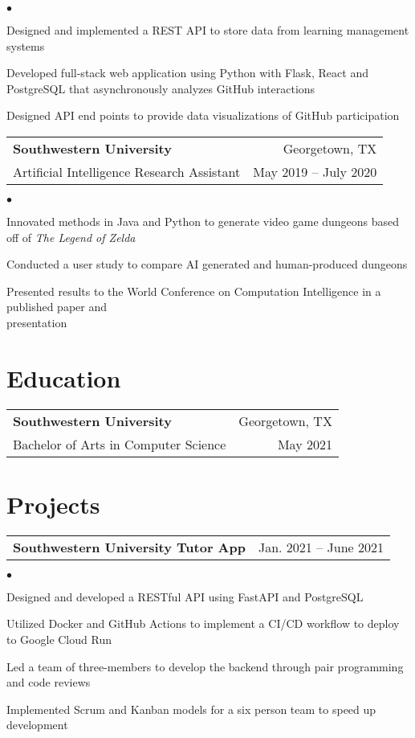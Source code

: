 \documentclass[margin, 11pt]{res}
\makeatletter
\newcommand{\resumeSubheading}[4]{

\begin{tabular*}{1.01\textwidth}{@{\hspace{-4pt}}l @{\extracolsep{\fill}} r}
\textbf{#1} & #2 \\
      {#3} &  {#4}
\end{tabular*}\vspace{-2pt}
}
\newcommand{\resumeSubSubheading}[2]{
\begin{tabular*}{1.01\textwidth}{@{\hspace{-4pt}}l @{\extracolsep{\fill}} r}
    #1 & #2 
\end{tabular*}\vspace{-7pt}
}
\newenvironment{list2}{
	\begin{list}{$\bullet$}{%
	    \small
		\setlength{\itemsep}{0in}
		\setlength{\parsep}{0in} \setlength{\parskip}{0in}
		\setlength{\topsep}{0in} \setlength{\partopsep}{0in}
		\setlength{\leftmargin}{0.2in}}}{\end{list}}
\makeatother
\begin{document}
\begin{resume}
\begin{list2}
\item{Designed and implemented a REST API to store data from learning management systems }
\item{Developed full-stack web application using Python with Flask, React and PostgreSQL that asynchronously analyzes GitHub interactions }
\item{Designed API end points to provide data visualizations of GitHub participation }
\end{list2}

\resumeSubheading{Southwestern University}{Georgetown, TX}
             {Artificial Intelligence Research Assistant}{May 2019 -- July 2020}

\begin{list2}
\item{Innovated methods in Java and Python to generate video game dungeons based off of \emph{The Legend of Zelda}}
\item{Conducted a user study to compare AI generated and human-produced dungeons}
\item{Presented results to the World Conference on Computation Intelligence in a published paper and \\presentation}
\end{list2}

\section{\sc Education}

\vspace{2pt}

\resumeSubheading{Southwestern University}{Georgetown, TX}
             {Bachelor of Arts in Computer Science}{May 2021}

\section{\sc Projects}

\resumeSubSubheading{\textbf{Southwestern University Tutor App}}{Jan. 2021 -- June 2021}

\begin{list2}
\item{Designed and developed a RESTful API using FastAPI and PostgreSQL}
\item{Utilized Docker and GitHub Actions to implement a CI/CD workflow to deploy to Google Cloud Run}
\item{Led a team of three-members to develop the backend through pair programming and code reviews}
\item{Implemented Scrum and Kanban models for a six person team to speed up development}
\end{list2}


\end{resume}
\end{document}
